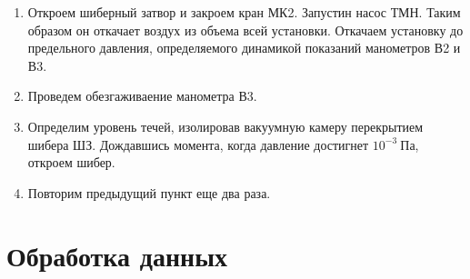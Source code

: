 \documentclass[14pt, a4paper]{report}
\begin{document}
\begin{enumerate}
\item Откроем шиберный затвор и закроем кран МК2. Запустин насос ТМН. Таким образом он откачает воздух из объема всей установки. Откачаем установку до предельного давления, определяемого динамикой показаний манометров В2 и В3.

\item Проведем обезгаживаение манометра В3.

\item Определим уровень течей, изолировав вакуумную камеру перекрытием шибера ШЗ. Дождавшись момента, когда давление достигнет $10^{-3}\ Па$, откроем шибер.

\item Повторим предыдущий пункт еще два раза.

\end{enumerate}

\section{Обработка данных}
\end{document}
